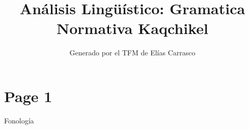 \documentclass{article}%
\title{Análisis Lingüístico: Gramatica Normativa Kaqchikel}%
\author{Generado por el TFM de Elías Carrasco}%
\begin{document}
%
\normalsize%
\maketitle%
\section{Page 1}%
\label{sec:Page1}%
Fonología 

%
\end{document}
